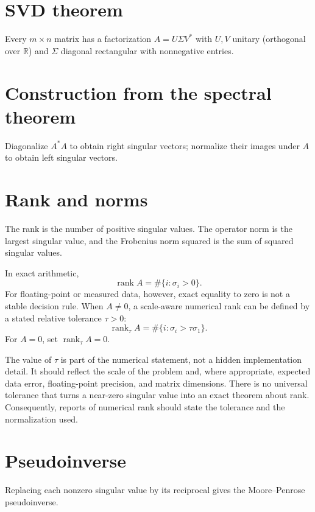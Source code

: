 \section{SVD theorem}
Every $m\times n$ matrix has a factorization $A=U\Sigma V^*$ with $U,V$ unitary (orthogonal over $\mathbb R$) and $\Sigma$ diagonal rectangular with nonnegative entries.

\section{Construction from the spectral theorem}
Diagonalize $A^*A$ to obtain right singular vectors; normalize their images under $A$ to obtain left singular vectors.

\section{Rank and norms}
The rank is the number of positive singular values. The operator norm is the largest singular value, and the Frobenius norm squared is the sum of squared singular values.

\begin{remark}
In exact arithmetic,
\[
\operatorname{rank}A=\#\{i:\sigma_i>0\}.
\]
For floating-point or measured data, however, exact equality to zero is not a
stable decision rule.  When \(A\neq0\), a scale-aware numerical rank can be
defined by a stated relative tolerance \(\tau>0\):
\[
\operatorname{rank}_{\tau}A
=
\#\{i:\sigma_i>\tau\sigma_1\}.
\]
For \(A=0\), set \(\operatorname{rank}_{\tau}A=0\).

The value of \(\tau\) is part of the numerical statement, not a hidden
implementation detail.  It should reflect the scale of the problem and, where
appropriate, expected data error, floating-point precision, and matrix
dimensions.  There is no universal tolerance that turns a near-zero singular
value into an exact theorem about rank.  Consequently, reports of numerical
rank should state the tolerance and the normalization used.
\end{remark}

\section{Pseudoinverse}
Replacing each nonzero singular value by its reciprocal gives the Moore–Penrose pseudoinverse.

